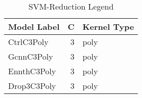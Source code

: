 \begin{table}
\centering
\caption{SVM-Reduction Legend}
\label{tab:SVM-Reduction_legend}
\begin{tabular}{lrl}
\toprule
Model Label & C & Kernel Type \\
\midrule
CtrlC3Poly & 3 & poly \\
GcnnC3Poly & 3 & poly \\
EnnthC3Poly & 3 & poly \\
Drop3C3Poly & 3 & poly \\
\bottomrule
\end{tabular}
\end{table}
